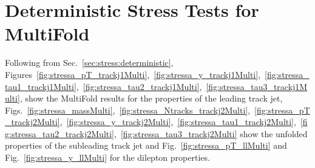 \documentclass[NOTE, atlasdraft=true, texlive=2016, UKenglish]{\ATLASLATEXPATH atlasdoc}
\begin{document}
\section{Deterministic Stress Tests for MultiFold}
\label{sec:stressmultifolddet}

Following from Sec.~\ref{sec:stress:deterministic}, Figures~\ref{fig:stressa_pT_trackj1Multi},~\ref{fig:stressa_y_trackj1Multi},~\ref{fig:stressa_tau1_trackj1Multi},~\ref{fig:stressa_tau2_trackj1Multi},~\ref{fig:stressa_tau3_trackj1Multi}, show the MultiFold results for the properties of the leading track jet, Figs.~\ref{fig:stressa_massMulti},~\ref{fig:stressa_Ntracks_trackj2Multi},~\ref{fig:stressa_pT_trackj2Multi},~\ref{fig:stressa_y_trackj2Multi},~\ref{fig:stressa_tau1_trackj2Multi},~\ref{fig:stressa_tau2_trackj2Multi},~\ref{fig:stressa_tau3_trackj2Multi} show the unfolded properties of the subleading track jet and Fig.~\ref{fig:stressa_pT_llMulti} and Fig.~\ref{fig:stressa_y_llMulti} for the dilepton properties.

\begin{figure}[h!]
\centering
{}\\
\\
\end{figure}
\end{document}
